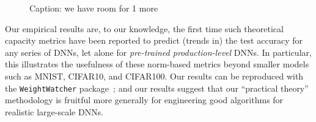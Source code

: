 \begin{figure}[H]
   \centering
   \vspace{-3mm}
   \caption{%
    Caption: we have room for 1 more 
   }
   \label{fig:alphahats}
\end{figure}


Our empirical results are, to our knowledge, the first time such theoretical capacity 
metrics have been reported to predict (trends in) the test accuracy for any series of DNNs, let alone for \emph{pre-trained production-level} DNNs.
In particular, this illustrates the usefulness of these norm-based metrics beyond smaller models such as MNIST, CIFAR10, and CIFAR100. 
Our  results can be reproduced with the \texttt{WeightWatcher} package~\cite{weightwatcher_package_justURL}; 
and our
results suggest that our ``practical theory'' methodology is fruitful more generally for engineering good algorithms for realistic large-scale DNNs.

\vspace{-2mm}
